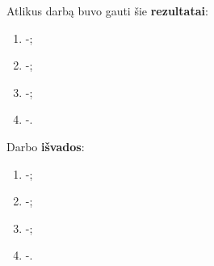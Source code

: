 \documentclass{VUMIFPSbakalaurinis}
\begin{document}





Atlikus darbą buvo gauti šie \textbf{rezultatai}:
\begin{enumerate}
    \item -;
    \item -;
    \item -;
    \item -.
\end{enumerate}

Darbo \textbf{išvados}:
\begin{enumerate}
    \item -;
    \item -;
    \item -;
    \item -.
\end{enumerate}

\printbibliography[heading=bibintoc]  %
\end{document}
